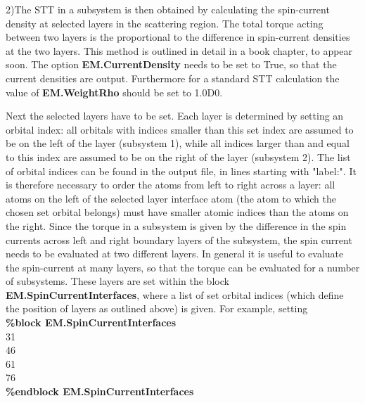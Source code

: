 \documentclass[11pt]{article}
\begin{document}
{2)The STT in a subsystem is then obtained by calculating the spin-current density at selected layers in the scattering region. The total torque acting between two layers is the proportional to the difference in spin-current densities at the two layers. This method is outlined in detail in a book chapter, to appear soon. The option {\bf EM.CurrentDensity} needs to be set to True, so that the current densities are output. 
Furthermore for a standard STT calculation the value of {\bf EM.WeightRho} should be set to 1.0D0.

Next the selected layers have to be set. Each layer is determined by setting an orbital index: all orbitals with indices smaller than this set index are assumed to be on the left of the layer (subsystem 1), while all indices larger than and equal to this index are assumed to be on the right of the layer (subsystem 2). The list of orbital indices can be found in the output file, in lines starting with "label:". It is therefore necessary to order the atoms from left to right across a layer: all atoms on the left of the selected layer interface atom (the atom to which the chosen set orbital belongs) must have smaller atomic indices than the atoms on the right. Since the torque in a subsystem is given by the difference in the spin currents across left and right boundary layers of the subsystem, the spin current needs to be evaluated at two different layers. In general it is useful to evaluate the spin-current at many layers, so that the torque can be evaluated for a number of subsystems. These layers are set within the block {\bf EM.SpinCurrentInterfaces}, where a list of set orbital indices (which define the position of layers as outlined above) is given. For example, setting\\
{\bf \%block EM.SpinCurrentInterfaces}\\
31\\
46\\
61\\
76\\
{\bf \%endblock EM.SpinCurrentInterfaces}\\
}
\end{document}
